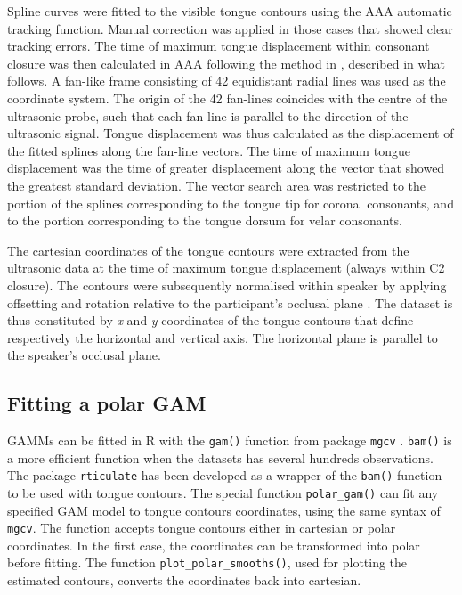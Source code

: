 \documentclass[12pt,]{article}
\begin{document}
Spline curves were fitted to the visible tongue contours using the AAA
automatic tracking function. Manual correction was applied in those
cases that showed clear tracking errors. The time of maximum tongue
displacement within consonant closure was then calculated in AAA
following the method in \citet{strycharczuk2015}, described in what
follows. A fan-like frame consisting of 42 equidistant radial lines was
used as the coordinate system. The origin of the 42 fan-lines coincides
with the centre of the ultrasonic probe, such that each fan-line is
parallel to the direction of the ultrasonic signal. Tongue displacement
was thus calculated as the displacement of the fitted splines along the
fan-line vectors. The time of maximum tongue displacement was the time
of greater displacement along the vector that showed the greatest
standard deviation. The vector search area was restricted to the portion
of the splines corresponding to the tongue tip for coronal consonants,
and to the portion corresponding to the tongue dorsum for velar
consonants.

The cartesian coordinates of the tongue contours were extracted from the
ultrasonic data at the time of maximum tongue displacement (always
within C2 closure). The contours were subsequently normalised within
speaker by applying offsetting and rotation relative to the
participant's occlusal plane \citep{scobbie2011}. The dataset is thus
constituted by \emph{x} and \emph{y} coordinates of the tongue contours
that define respectively the horizontal and vertical axis. The
horizontal plane is parallel to the speaker's occlusal plane.

\hypertarget{fitting-a-polar-gam}{%
\subsection{Fitting a polar GAM}\label{fitting-a-polar-gam}}

GAMMs can be fitted in R with the \texttt{gam()} function from package
\texttt{mgcv} \citep{wood2011, wood2017}. \texttt{bam()} is a more
efficient function when the datasets has several hundreds observations.
The package \texttt{rticulate} has been developed as a wrapper of the
\texttt{bam()} function to be used with tongue contours. The special
function \texttt{polar\_gam()} can fit any specified GAM model to tongue
contours coordinates, using the same syntax of \texttt{mgcv}. The
function accepts tongue contours either in cartesian or polar
coordinates. In the first case, the coordinates can be transformed into
polar before fitting. The function \texttt{plot\_polar\_smooths()}, used
for plotting the estimated contours, converts the coordinates back into
cartesian.
\end{document}
